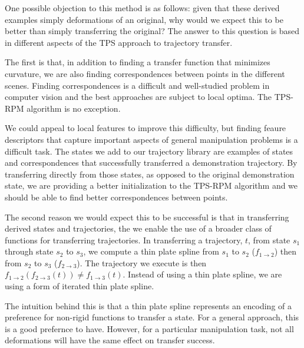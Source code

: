         

One possible objection to this method is as follows: given that these derived examples
simply deformations of an original, why would we expect this to be better than simply
transferring the original? The answer to this question is based in different
aspects of the TPS approach to trajectory transfer.

The first is that, in addition to finding a transfer function that minimizes curvature,
we are also finding correspondences between points in the different scenes. Finding 
correspondences is a difficult and well-studied problem in computer vision and the best
approaches are subject to local optima. The TPS-RPM algorithm is no exception. 

We could appeal to local features to improve this difficulty, but finding feaure descriptors 
that capture important aspects of general manipulation problems is a difficult task. The
states we add to our trajectory library are examples of states and correspondences that 
successfully transferred a demonstration trajectory. By transferring directly from those
states, as opposed to the original demonstration state, we are providing a better 
initialization to the TPS-RPM algorithm and we should be able to find better correspondences
between points.

The second reason we would expect this to be successful is that in transferring derived
states and trajectories, the we enable the use of a broader class of functions for 
transferring trajectories. In transferring a trajectory, $t$, from state $s_1$ through
state $s_2$ to $s_3$, we compute a thin plate spline from $s_1$ to $s_2$ 
($f_{1\rightarrow 2}$) then from $s_2$ to $s_3$ ($f_{2\rightarrow 3}$). The trajectory we
execute is then $f_{1\rightarrow 2}(f_{2\rightarrow 3}(t)) \ne f_{1\rightarrow 3}(t)$. 
Instead of using a thin plate spline, we are using a form of iterated thin plate spline.

The intuition behind this is that a thin plate spline represents an encoding of a preference
for non-rigid functions to transfer a state. For a general approach, this is a good
prefernce to have. However, for a particular manipulation task, not all deformations
will have the same effect on transfer success. 

